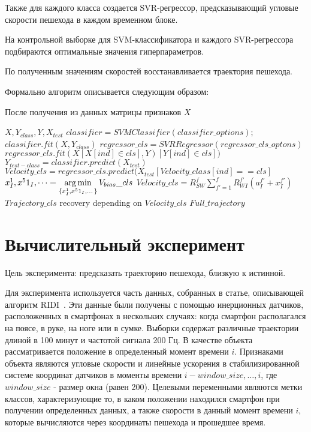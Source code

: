 \documentclass[12pt,twoside]{article}
\begin{document}
Также для каждого класса создается SVR-регрессор, предсказывающий угловые скорости пешехода в каждом временном блоке. 

На контрольной выборке для SVM-классификатора и каждого SVR-регрессора подбираются оптимальные значения гиперпараметров.

По полученным значениям скоростей восстанавливается траектория пешехода.

Формально алгоритм описывается следующим образом: 

После получения из данных матрицы признаков $X$

\begin{algorithmic}[1]
\REQUIRE $X, Y_{class}, Y, X_{test}$
\STATE $classifier = SVMClassifier(classifier\_options);$
\STATE $classifier.fit(X, Y_{class})$
\STATE $regressor\_cls = SVRRegressor(regressor\_cls\_optons)$
\STATE $regressor\_cls.fit(X[X[ind] \in cls], Y)[Y[ind] \in cls])$
\ENDFOR
\STATE $Y_{test-class} = classifier.predict(X_{test})$
\STATE $Velocity\_cls = regressor\_cls.predict(X_{test}
[Velocity\_class[ind] == cls]$
\STATE $x^1_I, x^51_I,\dots = \argmin_{\{x^1_I, x^51_I,\dots\}}V_{bias}\_cls$
\STATE $Velocity\_cls = R_{SW}^f\sum_{f'=1}^f R_{WI}^{f'}(a_I^{f'}+x_I^{f'})$
\STATE $Trajectory\_cls$ recovery depending on $Velocity\_cls$
\ENDFOR
\RETURN $Full\_trajectory$
\end{algorithmic}

\section{Вычислительный эксперимент}

Цель эксперимента: предсказать траекторию пешехода, близкую к истинной.

Для эксперимента используется часть данных, собранных в статье, описывающей алгоритм RIDI~\cite{journals/corr/abs-1712-09004}. Эти данные были получены с помощью инерционных датчиков, расположенных в смартфонах в нескольких случаях: когда смартфон располагался на поясе, в руке, на ноге или в сумке. Выборки содержат различные траектории длиной в 100 минут и частотой сигнала 200 Гц. В качестве объекта рассматривается положение в определенный момент времени $i$. Признаками объекта являются угловые скорости и линейные ускорения в стабилизированной системе координат датчиков в моменты времени $i-window\_size, \dots, i$, где $window\_size$ - размер окна (равен 200). Целевыми переменными являются метки классов, характеризующие то, в каком положении находился смартфон при получении определенных данных, а также скорости в данный момент времени $i$, которые вычисляются через координаты пешехода и прошедшее время.





\end{document}
